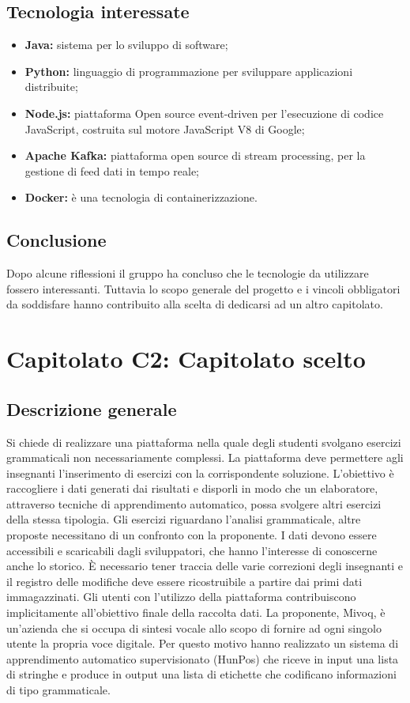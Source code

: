 \documentclass[11pt,a4paper]{article}
\begin{document}
	\subsection{Tecnologia interessate}
	\begin{itemize}
		\item \textbf{Java:} sistema per lo sviluppo di software;
		\item \textbf{Python:} linguaggio di programmazione per sviluppare applicazioni distribuite;
		\item \textbf{Node.js:} piattaforma Open source event-driven per l'esecuzione di codice JavaScript, costruita sul motore JavaScript V8 di Google;
		\item \textbf{Apache Kafka:} piattaforma open source di stream processing, per la gestione di feed dati in tempo reale;		
		\item \textbf{Docker:} è una tecnologia di containerizzazione.
	\end{itemize}
	\subsection{Conclusione}
	Dopo alcune riflessioni il gruppo ha concluso che le tecnologie da utilizzare fossero interessanti.
	Tuttavia lo scopo generale del progetto e i vincoli obbligatori da soddisfare hanno contribuito alla
	scelta di dedicarsi ad un altro capitolato.
	\newpage
	\section{Capitolato C2: Capitolato scelto}
	\subsection{Descrizione generale}
	Si chiede di realizzare una piattaforma nella quale degli studenti svolgano esercizi grammaticali non necessariamente complessi. La piattaforma deve permettere agli insegnanti l'inserimento di esercizi con la corrispondente soluzione. L'obiettivo è raccogliere i dati generati dai risultati e disporli in modo che un elaboratore, attraverso tecniche di apprendimento automatico, possa svolgere altri esercizi della stessa tipologia. Gli esercizi riguardano l'analisi grammaticale, altre proposte necessitano di un confronto con la proponente. I dati devono essere accessibili e scaricabili dagli sviluppatori, che hanno l'interesse di conoscerne anche lo storico. È necessario tener traccia delle varie correzioni degli insegnanti e il registro delle modifiche deve essere ricostruibile a partire dai primi dati immagazzinati. Gli utenti con l'utilizzo della piattaforma contribuiscono implicitamente all'obiettivo finale della raccolta dati. La proponente, Mivoq, è un'azienda che si occupa di sintesi vocale allo scopo di fornire ad ogni singolo utente la propria voce digitale. Per questo motivo hanno realizzato un sistema di apprendimento automatico supervisionato (HunPos) che riceve in input una lista di stringhe e produce in output una lista di etichette che codificano informazioni di tipo grammaticale.
\end{document}

